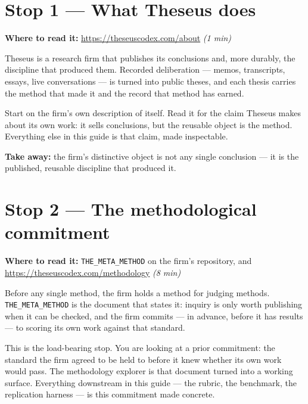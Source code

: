 \documentclass[11pt,letterpaper]{article}
\newcommand{\surface}[1]{\texttt{#1}}
\newcommand{\rt}[1]{\textsl{#1}}
\begin{document}
\newpage

\section{Stop 1 --- What Theseus does}

\textbf{Where to read it:} \url{https://theseuscodex.com/about} \quad \rt{(1 min)}

\medskip

Theseus is a research firm that publishes its conclusions and, more durably, the discipline that produced them. Recorded deliberation --- memos, transcripts, essays, live conversations --- is turned into public theses, and each thesis carries the method that made it and the record that method has earned.

Start on the firm's own description of itself. Read it for the claim Theseus makes about its own work: it sells conclusions, but the reusable object is the method. Everything else in this guide is that claim, made inspectable.

\textbf{Take away:} the firm's distinctive object is not any single conclusion --- it is the published, reusable discipline that produced it.

\section{Stop 2 --- The methodological commitment}

\textbf{Where to read it:} \surface{THE\_META\_METHOD} on the firm's repository, and \url{https://theseuscodex.com/methodology} \quad \rt{(8 min)}

\medskip

Before any single method, the firm holds a method for judging methods. \surface{THE\_META\_METHOD} is the document that states it: inquiry is only worth publishing when it can be checked, and the firm commits --- in advance, before it has results --- to scoring its own work against that standard.

This is the load-bearing stop. You are looking at a prior commitment: the standard the firm agreed to be held to before it knew whether its own work would pass. The methodology explorer is that document turned into a working surface. Everything downstream in this guide --- the rubric, the benchmark, the replication harness --- is this commitment made concrete.
\end{document}
